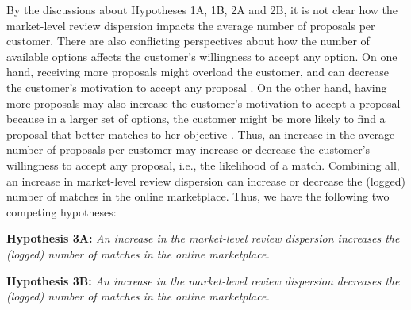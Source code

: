 \documentclass[msom,blindrev]{informs3}
\begin{document}
By the discussions about Hypotheses 1A, 1B, 2A and 2B, it is not clear how the market-level review dispersion impacts the average number of proposals per customer. There are also conflicting perspectives about how the number of available options affects the customer's willingness to accept any option. On one hand, receiving more proposals might overload the customer, and can decrease the customer's motivation to accept any proposal \citep{scheibehenne2010can,iyengar2000choice}. On the other hand, having more proposals may also increase the customer's motivation to accept a proposal because in a larger set of options, the customer  might be more likely to find a proposal that better matches to her objective \citep{scheibehenne2010can,baumol1956variety}. Thus, an increase in the average number of proposals per customer may increase or decrease the customer's willingness to accept any proposal, i.e., the likelihood of a match. Combining all, an increase in market-level review dispersion can increase or decrease the (logged) number of matches in the online marketplace. Thus, we have the following two competing hypotheses:

	
	
	\noindent\textbf{Hypothesis 3A:} \emph{An increase in the market-level review dispersion increases the (logged) number of matches in the online marketplace.}
	
	\noindent\textbf{Hypothesis 3B:} \emph{An increase in the market-level review dispersion decreases the (logged) number of matches in the online marketplace.}
	
	
	
	
\end{document}
